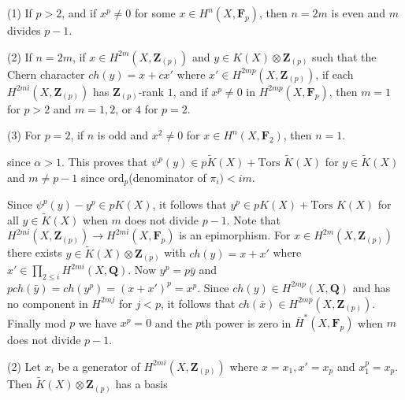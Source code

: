 (1) If $p > 2$, and if $x^p \neq 0$ for some $x \in H^n(X, \mathbf{F}_p)$, then $n = 2m$ is even and $m$ divides $p - 1$.

(2) If $n = 2m$, if $x \in H^{2m}(X, \mathbf{Z}_{(p)})$ and $y \in K(X) \otimes \mathbf{Z}_{(p)}$ such that the Chern character $ch(y) = x + cx'$ where $x' \in H^{2mp}(X, \mathbf{Z}_{(p)})$, if each $H^{2mi}(X, \mathbf{Z}_{(p)})$ has $\mathbf{Z}_{(p)}$-rank $1$, and if $x^p \neq 0$ in $H^{2mp}(X, \mathbf{F}_p)$, then $m = 1$ for $p > 2$ and $m = 1, 2$, or $4$ for $p = 2$.

(3) For $p = 2$, if $n$ is odd and $x^2 \neq 0$ for $x \in H^n(X, \mathbf{F}_2)$, then $n = 1$.

since $\alpha > 1$. This proves that $\psi^p(y) \in p\tilde{K}(X) + \text{Tors } \tilde{K}(X)$ for $y \in \tilde{K}(X)$ and $m \neq p - 1$ since ord$_p$(denominator of $\pi_i) < im$.

Since $\psi^p(y) - y^p \in pK(X)$, it follows that $y^p \in pK(X) + \text{Tors } K(X)$ for all $y \in \tilde{K}(X)$ when $m$ does not divide $p - 1$. Note that $H^{2mi}(X, \mathbf{Z}_{(p)}) \rightarrow H^{2mi}(X, \mathbf{F}_p)$ is an epimorphism. For $x \in H^{2m}(X, \mathbf{Z}_{(p)})$ there exists $y \in \tilde{K}(X) \otimes \mathbf{Z}_{(p)}$ with $ch(y) = x + x'$ where $x' \in \prod_{2 \leq i} H^{2mi}(X, \mathbf{Q})$. Now $y^p = p\bar{y}$ and $pch(\bar{y}) = ch(y^p) = (x + x')^p = x^p$. Since $ch(y) \in H^{2mp}(X, \mathbf{Q})$ and has no component in $H^{2mj}$ for $j < p$, it follows that $ch(\bar{x}) \in H^{2mp}(X, \mathbf{Z}_{(p)})$. Finally mod $p$ we have $x^p = 0$ and the $p$th power is zero in $\bar{H}^*(X, \mathbf{F}_p)$ when $m$ does not divide $p - 1$.

(2) Let $x_i$ be a generator of $H^{2mi}(X, \mathbf{Z}_{(p)})$ where $x = x_1, x' = x_p$ and $x_1^p = x_p$. Then $\tilde{K}(X) \otimes \mathbf{Z}_{(p)}$ has a basis
